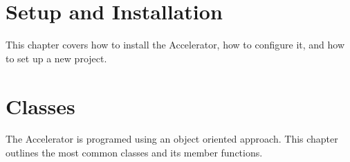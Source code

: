 \documentclass[a4paper]{report}
\begin{document}
\chapter{Setup and Installation}
This chapter covers how to install the Accelerator, how to configure
it, and how to set up a new project.



\chapter{Classes}
The Accelerator is programed using an object oriented approach.  This
chapter outlines the most common classes and its member functions.






\end{document}
